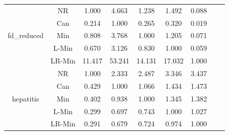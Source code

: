 \documentclass[11pt]{book}
\begin{document}
\begin{table}
\begin{tabular}{|c|c|c|c|c|c|c|c|c|}
    \hline
    \multirow{5}{*}{fd\_reduced}
         & NR & 1.000 & 4.663 & 1.238 & 1.492 & 0.088 \\                                                                                                                                                             
         & Can & 0.214 & 1.000 & 0.265 & 0.320 & 0.019 \\                                                                                                                                                            
         & Min & 0.808 & 3.768 & 1.000 & 1.205 & 0.071 \\                                                                                                                                                            
         & L-Min & 0.670 & 3.126 & 0.830 & 1.000 & 0.059 \\                                                                                                                                                          
         & LR-Min & 11.417 & 53.241 & 14.131 & 17.032 & 1.000 \\
    
    \hline
    \multirow{5}{*}{hepatitis}
         & NR & 1.000 & 2.333 & 2.487 & 3.346 & 3.437 \\                                                                                                                                                             
         & Can & 0.429 & 1.000 & 1.066 & 1.434 & 1.473 \\                                                                                                                                                            
         & Min & 0.402 & 0.938 & 1.000 & 1.345 & 1.382 \\                                                                                                                                                            
         & L-Min & 0.299 & 0.697 & 0.743 & 1.000 & 1.027 \\                                                                                                                                                          
         & LR-Min & 0.291 & 0.679 & 0.724 & 0.974 & 1.000 \\
         

\end{tabular}
\end{table}
\end{document}
